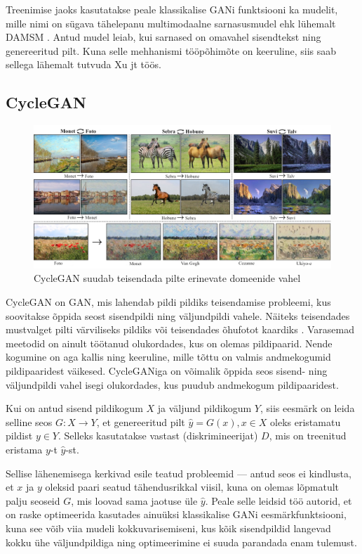 \documentclass{vilgym}
\begin{document}
	Treenimise jaoks kasutatakse peale klassikalise GANi funktsiooni ka mudelit, mille nimi on sügava tähelepanu multimodaalne sarnasusmudel ehk lühemalt DAMSM . Antud mudel leiab, kui sarnased on omavahel sisendtekst ning genereeritud pilt. Kuna selle mehhanismi tööpõhimõte on keeruline, siis saab sellega lähemalt tutvuda Xu jt töös. \parencite{attngan}

	\subsection{CycleGAN}
	\begin{figure}
		\centering
			\includegraphics[width=\linewidth]{images/cyclegan_est.png}
			\caption{CycleGAN suudab teisendada pilte erinevate domeenide vahel \parencite{cyclegan}}
			\label{fig:cyclegan}
	\end{figure}

	CycleGAN on GAN, mis lahendab pildi pildiks teisendamise probleemi, kus soovitakse õppida seost sisendpildi ning väljundpildi vahele. Näiteks teisendades mustvalget pilti värviliseks pildiks või teisendades õhufotot kaardiks . Varasemad meetodid on ainult töötanud olukordades, kus on olemas pildipaarid. Nende kogumine on aga kallis ning keeruline, mille tõttu on valmis andmekogumid pildipaaridest väikesed. CycleGANiga on võimalik õppida seos sisend- ning väljundpildi vahel isegi olukordades, kus puudub andmekogum pildipaaridest. 

	Kui on antud sisend pildikogum $ X $ ja väljund pildikogum $ Y $, siis eesmärk on leida selline seos $ G: X \rightarrow Y $, et genereeritud pilt $ \hat{y} = G(x), x \in X $ oleks eristamatu pildist $ y \in Y $. Selleks kasutatakse vastast (diskrimineerijat) $ D $, mis on treenitud eristama $ y $-t $ \hat{y} $-st. 

	Sellise lähenemisega kerkivad esile teatud probleemid --- antud seos ei kindlusta, et $ x $ ja $ y $ oleksid paari seatud tähendusrikkal viisil, kuna on olemas lõpmatult palju seoseid $ G $, mis loovad sama jaotuse üle $ \hat{y} $. Peale selle leidsid töö autorid, et on raske optimeerida kasutades ainuüksi klassikalise GANi eesmärkfunktsiooni, kuna see võib viia mudeli kokkuvarisemiseni, kus kõik sisendpildid langevad kokku ühe väljundpildiga ning optimeerimine ei suuda parandada enam tulemust.
\end{document}
